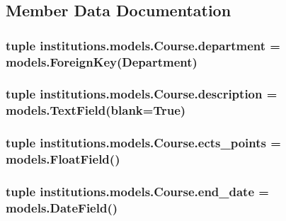 \subsection{Member Data Documentation}
\hypertarget{classinstitutions_1_1models_1_1_course_a1d57fe16fd6b01ef9b36012135ea21a2}{
\subsubsection[{department}]{\setlength{\rightskip}{0pt plus 5cm}tuple institutions.\-models.\-Course.\-department = models.\-Foreign\-Key({\bf Department})\hspace{0.3cm}{\ttfamily [static]}}}\label{classinstitutions_1_1models_1_1_course_a1d57fe16fd6b01ef9b36012135ea21a2}
\hypertarget{classinstitutions_1_1models_1_1_course_a6e7537e93fc978769a7c1e5fcb543ff2}{
\subsubsection[{description}]{\setlength{\rightskip}{0pt plus 5cm}tuple institutions.\-models.\-Course.\-description = models.\-Text\-Field(blank=True)\hspace{0.3cm}{\ttfamily [static]}}}\label{classinstitutions_1_1models_1_1_course_a6e7537e93fc978769a7c1e5fcb543ff2}
\hypertarget{classinstitutions_1_1models_1_1_course_a422f0672536b39978a360ed6eb1a5712}{
\subsubsection[{ects\-\_\-points}]{\setlength{\rightskip}{0pt plus 5cm}tuple institutions.\-models.\-Course.\-ects\-\_\-points = models.\-Float\-Field()\hspace{0.3cm}{\ttfamily [static]}}}\label{classinstitutions_1_1models_1_1_course_a422f0672536b39978a360ed6eb1a5712}
\hypertarget{classinstitutions_1_1models_1_1_course_a8ff56866cd201ac761e31c4723ff6759}{
\subsubsection[{end\-\_\-date}]{\setlength{\rightskip}{0pt plus 5cm}tuple institutions.\-models.\-Course.\-end\-\_\-date = models.\-Date\-Field()\hspace{0.3cm}{\ttfamily [static]}}}\label{classinstitutions_1_1models_1_1_course_a8ff56866cd201ac761e31c4723ff6759}
